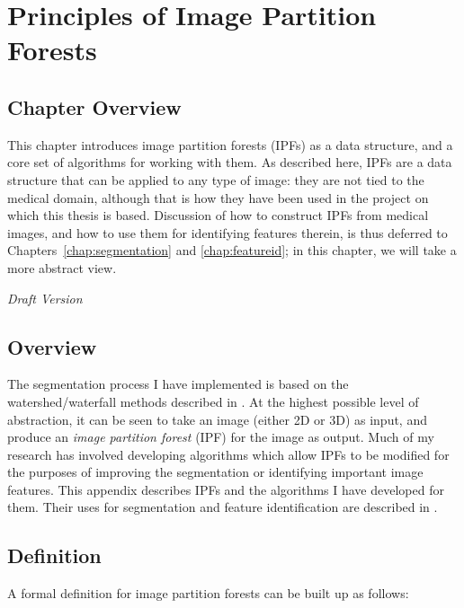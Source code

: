 \chapter{Principles of Image Partition Forests}
\label{chap:ipfs}

\section{Chapter Overview}

This chapter introduces image partition forests (IPFs) as a data structure, and a core set of algorithms for working with them. As described here, IPFs are a data structure that can be applied to any type of image: they are not tied to the medical domain, although that is how they have been used in the project on which this thesis is based. Discussion of how to construct IPFs from medical images, and how to use them for identifying features therein, is thus deferred to Chapters~\ref{chap:segmentation} and \ref{chap:featureid}; in this chapter, we will take a more abstract view.

\vspace{\baselineskip}

\emph{Draft Version}

\def\acronym#1{\mbox{\textup{\textbf{#1}}}}

\section{Overview}

The segmentation process I have implemented is based on the watershed/waterfall methods described in \cite{meijster98,marcotegui05}. At the highest possible level of abstraction, it can be seen to take an image (either 2D or 3D) as input, and produce an \emph{image partition forest} (IPF) for the image as output. Much of my research has involved developing algorithms which allow IPFs to be modified for the purposes of improving the segmentation or identifying important image features. This appendix describes IPFs and the algorithms I have developed for them. Their uses for segmentation and feature identification are described in \cite{gvccimi08,gvcispa09}.


\section{Definition}

A formal definition for image partition forests can be built up as follows:

